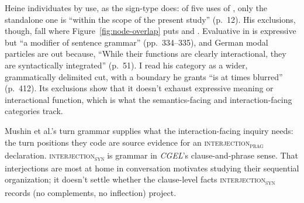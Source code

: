 \documentclass[12pt]{article}
\newcommand{\intj}[1]{\textsc{interjection\textsubscript{#1}}}
\begin{document}
Heine individuates by use, as the sign-type does: of five uses of
, only the standalone one is \enquote{within the scope of the
present study} (p.~12). His exclusions, though, fall where
Figure~\ref{fig:node-overlap} puts  and .
Evaluative  in  is
expressive but \enquote{a modifier of sentence grammar} (pp.~334--335), and
German modal particles are out because, \enquote{While their functions are
clearly interactional, they are syntactically integrated} (p.~51). I read
his category as a wider, grammatically delimited cut, with a boundary he
grants \enquote{is at times blurred} (p.~412). Its exclusions show that it
doesn't exhaust expressive meaning or interactional function, which is what
the semantics-facing and interaction-facing categories track.

Mushin et al.'s turn grammar supplies what the interaction-facing inquiry
needs: the turn positions they code are source evidence for an \intj{prag}
declaration. \intj{syn} is grammar in \textit{CGEL}'s clause-and-phrase
sense. That interjections are most at home in conversation motivates
studying their sequential organization; it doesn't settle whether the
clause-level facts \intj{syn} records (no complements, no inflection)
project.
\end{document}
